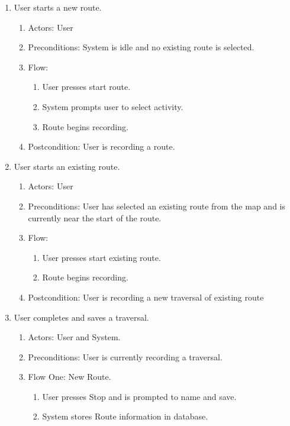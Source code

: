﻿\documentclass{article}
\begin{document}
\begin{enumerate}
\item User starts a new route.
    \begin{enumerate}
        \item Actors: User
        \item Preconditions: System is idle and no existing route is selected.
        \item Flow:
            \begin{enumerate}
                \item User presses start route.
                \item System prompts user to select activity.
                \item Route begins recording.
            \end{enumerate}
        \item Postcondition: User is recording a route.
    \end{enumerate}
\item User starts an existing route.
    \begin{enumerate}
        \item Actors: User
        \item Preconditions: User has selected an existing route from the map and is currently near the start of the route.
        \item Flow:
            \begin{enumerate}
                \item User presses start existing route.
                \item Route begins recording.
            \end{enumerate}
        \item Postcondition: User is recording a new traversal of existing route
    \end{enumerate}
\item User completes and saves a traversal.
    \begin{enumerate}
        \item Actors: User and System.
        \item Preconditions: User is currently recording a traversal.
        \item Flow One: New Route.
            \begin{enumerate}
            \item User presses Stop and is prompted to name and save.
            \item System stores Route information in database.

\end{enumerate}
\end{enumerate}
\end{enumerate}
\end{document}
